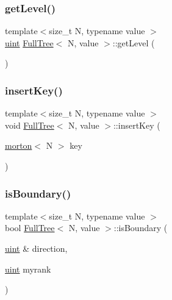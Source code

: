 \mbox{\label{classFullTree_abed32a809a754eab0ae47257da1863b4}} 
\subsubsection{\texorpdfstring{get\+Level()}{getLevel()}}
{\footnotesize\ttfamily template$<$size\+\_\+t N, typename value $>$ \\
\mbox{\hyperlink{definitions_8h_a69aa29b598b851b0640aa225a9e5d61d}{uint}} \mbox{\hyperlink{classFullTree}{Full\+Tree}}$<$ N, value $>$\+::get\+Level (\begin{DoxyParamCaption}{ }\end{DoxyParamCaption})}

\mbox{\label{classFullTree_abce6ea3ea3393373f32a5b7ccfcac976}} 
\subsubsection{\texorpdfstring{insert\+Key()}{insertKey()}}
{\footnotesize\ttfamily template$<$size\+\_\+t N, typename value $>$ \\
void \mbox{\hyperlink{classFullTree}{Full\+Tree}}$<$ N, value $>$\+::insert\+Key (\begin{DoxyParamCaption}\item[{\mbox{\hyperlink{definitions_8h_af8682350bd8bb38ee9023f7a0a310add}{morton}}$<$ N $>$}]{key }\end{DoxyParamCaption})}

\mbox{\label{classFullTree_acb1eec16a6b73e2a465b7a32319fe4f6}} 
\subsubsection{\texorpdfstring{is\+Boundary()}{isBoundary()}}
{\footnotesize\ttfamily template$<$size\+\_\+t N, typename value $>$ \\
bool \mbox{\hyperlink{classFullTree}{Full\+Tree}}$<$ N, value $>$\+::is\+Boundary (\begin{DoxyParamCaption}\item[{\mbox{\hyperlink{definitions_8h_a69aa29b598b851b0640aa225a9e5d61d}{uint}} \&}]{direction,  }\item[{\mbox{\hyperlink{definitions_8h_a69aa29b598b851b0640aa225a9e5d61d}{uint}}}]{myrank }\end{DoxyParamCaption})}

